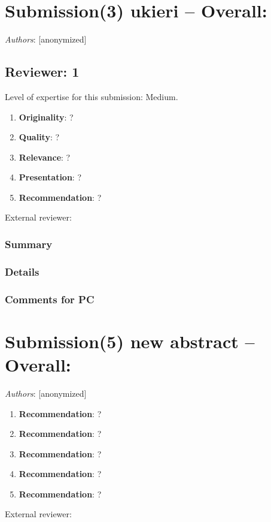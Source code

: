 \documentclass{article}
\begin{document}
  

\section{Submission(3) ukieri -- Overall: }  

\textit{Authors}: [anonymized]

     
 \subsection{Reviewer:  1 }
    
   Level of expertise for this submission: Medium.   
\begin{enumerate}
    
      \item \textbf{Originality}: ?
      \item \textbf{Quality}: ?
      \item \textbf{Relevance}: ?
      \item \textbf{Presentation}: ?
      \item \textbf{Recommendation}: ?
 \end{enumerate}
External reviewer:      
   \subsubsection*{Summary}
   
      
   \subsubsection*{Details}
   

   \subsubsection*{Comments for PC}
   

  

\section{Submission(5) new abstract -- Overall: }  

\textit{Authors}: [anonymized]

     
\begin{enumerate}
    
      \item \textbf{Recommendation}: ?
      \item \textbf{Recommendation}: ?
      \item \textbf{Recommendation}: ?
      \item \textbf{Recommendation}: ?
      \item \textbf{Recommendation}: ?
 \end{enumerate}
External reviewer:      
\end{document}
